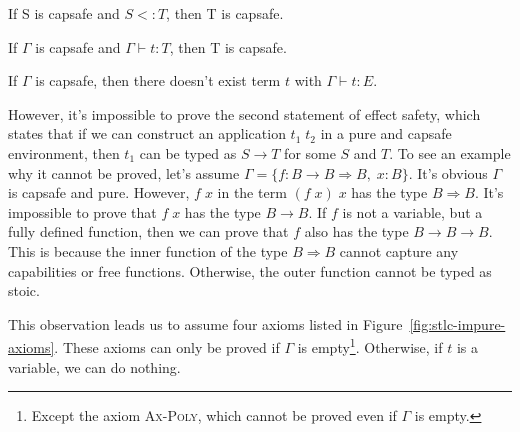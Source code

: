 \begin{lemma}
 If S is capsafe and $S <: T$, then T is capsafe.
\end{lemma}

\begin{lemma}
  If $\Gamma$ is capsafe and $\Gamma \vdash t : T$, then T is capsafe.
\end{lemma}

\begin{theorem}
  If $\Gamma$ is capsafe, then there doesn't exist term $t$ with
  $\Gamma \vdash t : E$.
\end{theorem}

However, it's impossible to prove the second statement of effect
safety, which states that if we can construct an application
$t_1 \; t_2$ in a pure and capsafe environment, then $t_1$ can be
typed as $S \to T$ for some $S$ and $T$. To see an example why it
cannot be proved, let's assume
$\Gamma = \{f: B \to B \Rightarrow B, \; x: B\}$. It's obvious
$\Gamma$ is capsafe and pure. However, $f \; x$ in the term
$(f \; x) \;x$ has the type $B \Rightarrow B$. It's impossible to
prove that $f \; x$ has the type $B \to B$. If $f$ is not a variable,
but a fully defined function, then we can prove that $f$ also has the
type $B \to B \to B$. This is because the inner function of the type
$B \Rightarrow B$ cannot capture any capabilities or free functions.
Otherwise, the outer function cannot be typed as stoic.

This observation leads us to assume four axioms listed in
Figure~\ref{fig:stlc-impure-axioms}. These axioms can only be proved
if $\Gamma$ is empty\footnote{Except the axiom \textsc{Ax-Poly}, which
  cannot be proved even if $\Gamma$ is empty.}. Otherwise, if $t$ is a
variable, we can do nothing.

